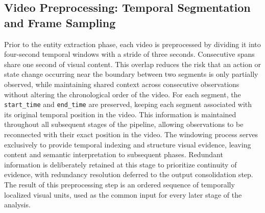 \subsection*{Video Preprocessing: Temporal Segmentation and Frame Sampling}
Prior to the entity extraction phase, each video is preprocessed by dividing it into four-second temporal windows with a stride of three seconds. Consecutive spans share one second of visual content. This overlap reduces the risk that an action or state change occurring near the boundary between two segments is only partially observed, while maintaining shared context across consecutive observations without altering the chronological order of the video.
For each segment, the \texttt{start\_time} and \texttt{end\_time} are preserved, keeping each segment associated with its original temporal position in the video. This information is maintained throughout all subsequent stages of the pipeline, allowing observations to be reconnected with their exact position in the video.
The windowing process serves exclusively to provide temporal indexing and structure visual evidence, leaving content and semantic interpretation to subsequent phases. Redundant information is deliberately retained at this stage to prioritize continuity of evidence, with redundancy resolution deferred to the output consolidation step. The result of this preprocessing step is an ordered sequence of temporally localized visual units, used as the common input for every later stage of the analysis.

